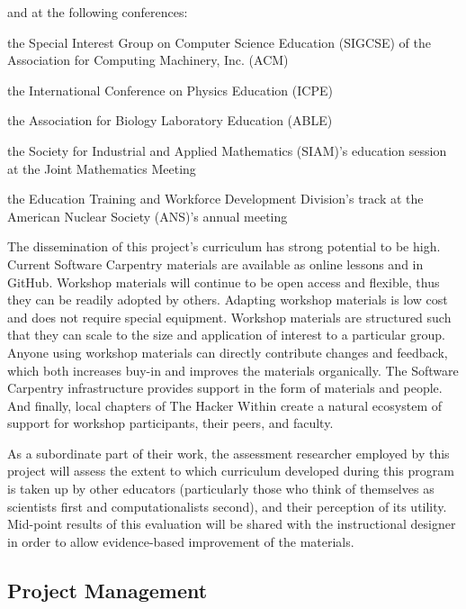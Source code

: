 \documentclass{proposalnsf}
\newlength{\up}
\begin{document}
and at the following conferences:

\begin{compactitem}

\item
  the Special Interest Group on Computer Science Education (SIGCSE) of
  the Association for Computing Machinery, Inc. (ACM)

\item
  the International Conference on Physics Education (ICPE)

\item
  the Association for Biology Laboratory Education (ABLE)

\item
  the Society for Industrial and Applied Mathematics (SIAM)'s
  education session at the Joint Mathematics Meeting

\item
  the Education Training and Workforce Development Division's track at
  the American Nuclear Society (ANS)'s annual meeting

\end{compactitem}

The dissemination of this project's curriculum has strong potential to
be high. Current Software Carpentry materials are available as online lessons and in GitHub. Workshop materials will continue to be open access and flexible, thus they can be readily adopted by others. Adapting workshop materials is
low cost and does not require special equipment. Workshop materials
are structured such that they can scale to the size and application of
interest to a particular group. Anyone using
workshop materials can directly contribute changes and feedback, which
both increases buy-in and improves the materials organically. The Software Carpentry infrastructure
provides support in the form of materials and people. And
finally, local chapters of The Hacker Within create a natural
ecosystem of support for workshop participants, their peers, and
faculty.

As a subordinate part of their work, the assessment researcher employed by this
project will assess the extent to which curriculum developed during
this program is taken up by other educators (particularly those who
think of themselves as scientists first and computationalists second),
and their perception of its utility.  Mid-point results of this
evaluation will be shared with the instructional designer in order to
allow evidence-based improvement of the materials.

\subsection{Project Management}
\end{document}

